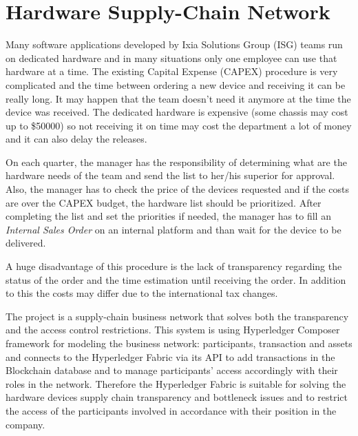 \chapter{Hardware Supply-Chain Network}
\label{chapter:chapter4}

Many software applications developed by Ixia Solutions Group (ISG) teams run on dedicated hardware and in many situations only one employee can use that hardware at a time.
The existing Capital Expense (CAPEX) procedure is very complicated and the time between ordering a new device and receiving it can be really long. It may happen that the team doesn't need it anymore at the time the device was received. The dedicated hardware is expensive (some chassis may cost up to \$50000) so not receiving it on time may cost the department a lot of money and it can also delay the releases.

On each quarter, the manager has the responsibility of determining what are the hardware needs of the team and send the list to her/his superior for approval.
Also, the manager has to check the price of the devices requested and if the costs are over the CAPEX budget, the hardware list should be prioritized. 
After completing the list and set the priorities if needed, the manager has to fill an \emph{Internal Sales Order} on an internal platform and than wait for the device to be delivered.

A huge disadvantage of this procedure is the lack of transparency regarding the status of the order and the time estimation until receiving the order.
In addition to this the costs may differ due to the international tax changes. 

The \textbf{\emph{{\project}}} project is a supply-chain business network that solves both the transparency and the access control restrictions.
This system is using Hyperledger Composer framework for modeling the business network: participants, transaction and assets and connects to the Hyperledger Fabric via its API to add transactions in the Blockchain database and to manage participants' access accordingly with their roles in the network.
Therefore the Hyperledger Fabric is suitable for solving the hardware devices supply chain transparency and bottleneck issues and to restrict the access of the participants involved in accordance with their position in the company.


